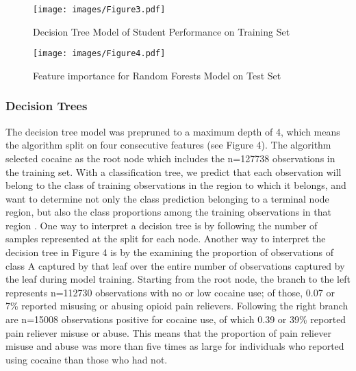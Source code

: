 \documentclass[sigconf]{acmart}
\begin{document}
\begin{figure}[!ht]
  \centering\texttt{[image: images/Figure3.pdf]}
  \caption{Decision Tree Model of Student Performance on Training Set}
  \label{f:Figure3}
\end{figure}

\begin{figure}[!ht]
  \centering\texttt{[image: images/Figure4.pdf]}
  \caption{Feature importance for Random Forests Model on Test Set}
  \label{f:Figure4}
\end{figure}







\subsubsection{Decision Trees} 

The decision tree model was prepruned to a maximum depth of 4, which means 
the algorithm split on four consecutive features (see Figure 4). The  
algorithm selected cocaine as the root node which includes the n=127738 
observations in the training set. With a classification tree, we predict 
that each observation will belong to the class of training observations in 
the region to which it belongs, and want to determine not only the class
prediction belonging to a terminal node region, but also the class 
proportions among the training observations in that region \cite{james13}. 
One way to interpret a decision tree is by following the number of samples 
represented at the split for each node. Another way to interpret the decision 
tree in Figure 4 is by the examining the proportion of observations of 
class A captured by that leaf over the entire number of observations captured 
by the leaf during model training. Starting from the root node, the branch 
to the left represents n=112730 observations with no or low cocaine use; 
of those, 0.07 or 7\% reported misusing or abusing opioid pain relievers. 
Following the right branch are n=15008 observations positive for cocaine use, 
of which 0.39 or 39\% reported pain reliever misuse or abuse. This means that 
the proportion of pain reliever misuse and abuse was more than five times as 
large for individuals who reported using cocaine than those who had not. 

\end{document}
